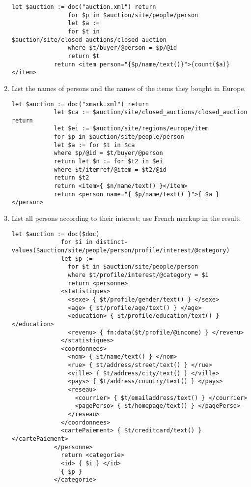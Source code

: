 \begin{enumerate}[label=Q\arabic*.]
		\begin{lstlisting}[style=XQuery]
			let $auction := doc("auction.xml") return
				for $p in $auction/site/people/person
				let $a :=
				for $t in $auction/site/closed_auctions/closed_auction
				where $t/buyer/@person = $p/@id
				return $t
			return <item person="{$p/name/text()}">{count($a)}</item>
		\end{lstlisting}	
		\item %
			List the names of persons and the names of the items they bought in Europe.
		\begin{lstlisting}[style=XQuery]
			let $auction := doc("xmark.xml") return
			let $ca := $auction/site/closed_auctions/closed_auction return
			let $ei := $auction/site/regions/europe/item
			for $p in $auction/site/people/person
			let $a := for $t in $ca
			where $p/@id = $t/buyer/@person
			return let $n := for $t2 in $ei
			where $t/itemref/@item = $t2/@id
			return $t2
			return <item>{ $n/name/text() }</item>
			return <person name="{ $p/name/text() }">{ $a }</person>
		\end{lstlisting}	
		\item %
			List all persons according to their interest; use French markup in the result.
		\begin{lstlisting}[style=XQuery]
			let $auction := doc($doc)
              for $i in distinct-values($auction/site/people/person/profile/interest/@category)
              let $p :=
                for $t in $auction/site/people/person
                where $t/profile/interest/@category = $i
                return <personne>
              <statistiques>
                <sexe> { $t/profile/gender/text() } </sexe>
                <age> { $t/profile/age/text() } </age>
                <education> { $t/profile/education/text() } </education>
                <revenu> { fn:data($t/profile/@income) } </revenu>
              </statistiques>
              <coordonnees>
                <nom> { $t/name/text() } </nom>
                <rue> { $t/address/street/text() } </rue>
                <ville> { $t/address/city/text() } </ville>
                <pays> { $t/address/country/text() } </pays>
                <reseau>
                  <courrier> { $t/emailaddress/text() } </courrier>
                  <pagePerso> { $t/homepage/text() } </pagePerso>
                </reseau>
              </coordonnees>
              <cartePaiement> { $t/creditcard/text() } </cartePaiement>
            </personne>
              return <categorie>
              <id> { $i } </id>
              { $p }
            </categorie>

\end{lstlisting}
\end{enumerate}
